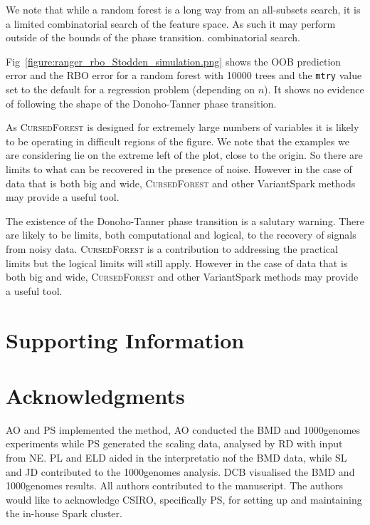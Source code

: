 \documentclass[10pt,letterpaper]{article}
\newcommand{\cursedforest}{\textsc{CursedForest}\xspace}
\newcommand{\mtry}{\texttt{mtry}\xspace}
\begin{document}
We note that while a random forest is a long way from an all-subsets search, it is a limited combinatorial search of
the feature space. As such it may perform outside of the bounds of the phase transition. 
  combinatorial search.


Fig~\ref{figure:ranger_rbo_Stodden_simulation.png} shows the OOB prediction error and the RBO error for a random forest with 10000 trees and the \mtry value set
to the default for a regression problem (depending on $n$). It shows no evidence of following the shape of the
Donoho-Tanner phase transition.


As \cursedforest is designed for extremely large numbers of variables it is likely to be operating in difficult regions of the figure.
We note that the examples we are considering lie on the extreme left of the plot, close to the origin. So there are
limits to what can be recovered in the presence of noise. However in the case of data that is both big and wide,
\cursedforest and other VariantSpark methods may provide a useful tool.

The existence of the  Donoho-Tanner phase transition is a salutary warning. There are likely to be limits, both
computational and logical, to the recovery of signals from noisy data. \cursedforest  is a contribution to addressing the
practical limits but the logical limits will still apply. However in the case of data that is both big and wide,
\cursedforest and other VariantSpark methods may provide a useful tool.


\clearpage
\section{Supporting Information}



\section*{Acknowledgments}
AO and PS implemented the method, AO conducted the BMD and 1000genomes experiments while PS generated the scaling data,
analysed by RD with input from NE. PL and ELD aided in the interpretatio nof the BMD data, while SL and JD contributed
to the 1000genomes analysis. DCB visualised the BMD and 1000genomes results. All authors contributed to the manuscript.
The authors would like to acknowledge CSIRO, specifically PS, for setting up and maintaining the in-house Spark cluster.

\nolinenumbers


\end{document}
